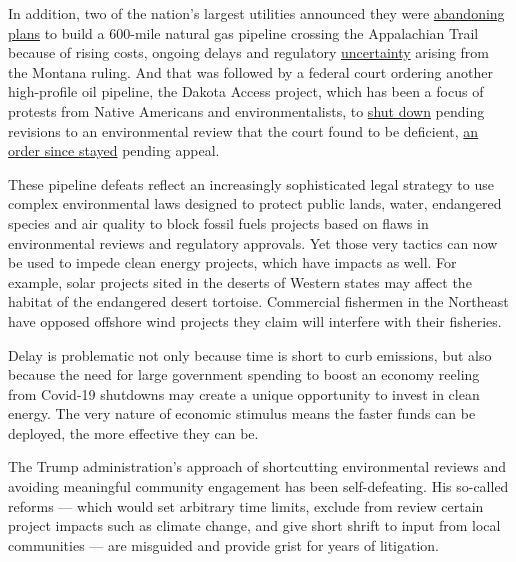 In addition, two of the nation's largest utilities announced they were
\href{https://www.nytimes.com/2020/07/05/business/atlantic-coast-pipeline-cancel-dominion-energy-berkshire-hathaway.html}{abandoning
plans} to build a 600-mile natural gas pipeline crossing the Appalachian
Trail because of rising costs, ongoing delays and regulatory
\href{https://news.dominionenergy.com/2020-07-05-Dominion-Energy-and-Duke-Energy-Cancel-the-Atlantic-Coast-Pipeline}{uncertainty}
arising from the Montana ruling. And that was followed by a federal
court ordering another high-profile oil pipeline, the Dakota Access
project, which has been a focus of protests from Native Americans and
environmentalists, to
\href{https://www.nytimes.com/aponline/2020/07/06/business/ap-us-dakota-access-pipeline.html}{shut
down} pending revisions to an environmental review that the court found
to be deficient,
\href{https://www.marketwatch.com/story/federal-appeals-court-temporarily-halts-dakota-access-pipeline-shutdown-2020-07-14}{an
order since stayed} pending appeal.

These pipeline defeats reflect an increasingly sophisticated legal
strategy to use complex environmental laws designed to protect public
lands, water, endangered species and air quality to block fossil fuels
projects based on flaws in environmental reviews and regulatory
approvals. Yet those very tactics can now be used to impede clean energy
projects, which have impacts as well. For example, solar projects sited
in the deserts of Western states may affect the habitat of the
endangered desert tortoise. Commercial fishermen in the Northeast have
opposed offshore wind projects they claim will interfere with their
fisheries.

Delay is problematic not only because time is short to curb emissions,
but also because the need for large government spending to boost an
economy reeling from Covid-19 shutdowns may create a unique opportunity
to invest in clean energy. The very nature of economic stimulus means
the faster funds can be deployed, the more effective they can be.

The Trump administration's approach of shortcutting environmental
reviews and avoiding meaningful community engagement has been
self-defeating. His so-called reforms --- which would set arbitrary time
limits, exclude from review certain project impacts such as climate
change, and give short shrift to input from local communities --- are
misguided and provide grist for years of litigation.

